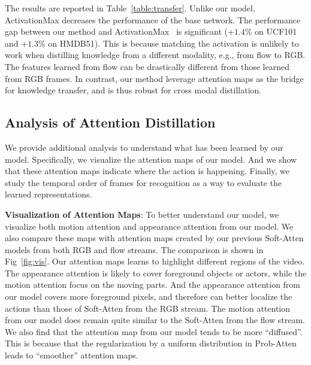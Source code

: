 \documentclass[10pt,twocolumn,letterpaper]{article}
\begin{document}
The results are reported in Table~\ref{table:transfer}. Unlike our model, ActivationMax decreases the performance of the base network. The performance gap between our method and ActivationMax~\cite{Zagoruyko2017AT} is significant (+$1.4\%$ on UCF101 and +$1.3\%$ on HMDB51). This is because matching the activation is unlikely to work when distilling knowledge from a different modality, e.g., from flow to RGB. The features learned from flow can be drastically different from those learned from RGB frames. In contrast, our method leverage attention maps as the bridge for knowledge transfer, and is thus robust for cross modal distillation. 

\subsection{Analysis of Attention Distillation}
We provide additional analysis to understand what has been learned by our model. Specifically, we visualize the attention maps of our model. And we show that these attention maps indicate where the action is happening. Finally, we study the temporal order of frames for recognition as a way to evaluate the learned representations. 

\noindent \textbf{Visualization of Attention Maps}: 
To better understand our model, we visualize both motion attention and appearance attention from our model. We also compare these maps with attention maps created by our previous Soft-Atten models from both RGB and flow streams. The comparison is shown in Fig~\ref{fig:vis}. Our attention maps learns to highlight different regions of the video. The appearance attention is likely to cover foreground objects or actors, while the motion attention focus on the moving parts. And the appearance attention from our model covers more foreground pixels, and therefore can better localize the actions than those of Soft-Atten from the RGB stream. The motion attention from our model does remain quite similar to the Soft-Atten from the flow stream. We also find that the attention map from our model tends to be more ``diffused''. This is because that the regularization by a uniform distribution in Prob-Atten leads to ``smoother'' attention maps.
\end{document}
